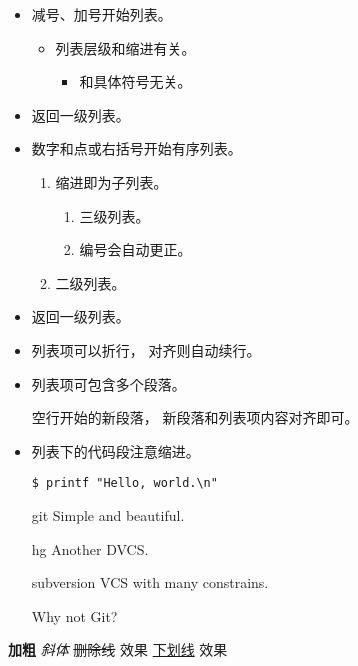 \documentclass[11pt]{ctexart}
\begin{document}
\begin{itemize}
\item 减号、加号开始列表。

\begin{itemize}
\item 列表层级和缩进有关。

\begin{itemize}
\item 和具体符号无关。
\end{itemize}
\end{itemize}

\item 返回一级列表。

\item 数字和点或右括号开始有序列表。

\begin{enumerate}
\item 缩进即为子列表。

\begin{enumerate}
\item 三级列表。
\item 编号会自动更正。
\end{enumerate}

\item 二级列表。
\end{enumerate}

\item 返回一级列表。

\item 列表项可以折行，
对齐则自动续行。

\item 列表项可包含多个段落。

空行开始的新段落，
新段落和列表项内容对齐即可。

\item 列表下的代码段注意缩进。

\lstset{language=bash,label= ,caption= ,captionpos=b,numbers=none}
\begin{lstlisting}
$ printf "Hello, world.\n"
\end{lstlisting}

\item[{git}] Simple and beautiful.
\item[{hg}] Another DVCS.
\item[{subversion}] VCS with many constrains.

Why not Git?
\end{itemize}


\textbf{加粗} \emph{斜体} \sout{删除线} 效果 \uline{下划线} 效果
\end{document}
